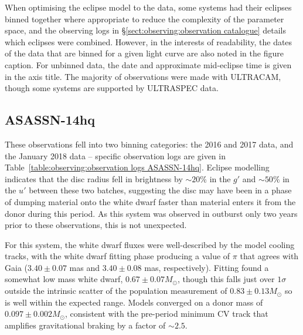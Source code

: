 When optimising the eclipse model to the data, some systems had their eclipses binned together where appropriate to reduce the complexity of the parameter space, and the observing logs in \S\ref{sect:observing:observation catalogue} details which eclipses were combined. However, in the interests of readability, the dates of the data that are binned for a given light curve are also noted in the figure caption. For unbinned data, the date and approximate mid-eclipse time is given in the axis title.
The majority of observations were made with ULTRACAM, though some systems are supported by ULTRASPEC data.



\newpage
\subsection{ASASSN-14hq}

These observations fell into two binning categories: the 2016 and 2017 data, and the January 2018 data -- specific observation logs are given in Table~\ref{table:observing:observation logs ASASSN-14hq}.
Eclipse modelling indicates that the disc radius fell in brightness by $\sim 20\%$ in the $g'$ and $\sim 50\%$ in the $u'$ between these two batches, suggesting the disc may have been in a phase of dumping material onto the white dwarf faster than material enters it from the donor during this period. As this system was observed in outburst only two years prior to these observations, this is not unexpected.

For this system, the white dwarf fluxes were well-described by the model cooling tracks, with the white dwarf fitting phase producing a value of $\pi$ that agrees with Gaia ($3.40\pm0.07$ mas and $3.40\pm0.08$ mas, respectively).
Fitting found a somewhat low mass white dwarf, $0.67 \pm 0.07 M_\odot$, though this falls just over $1\sigma$ outside the intrinsic scatter of the \citet{pala2020} population measurement of $0.83\pm0.13 M_\odot$ so is well within the expected range. Models converged on a donor mass of $0.097\pm0.002 M_\odot$, consistent with the pre-period minimum CV track that amplifies gravitational braking by a factor of $\sim 2.5$.

%     


